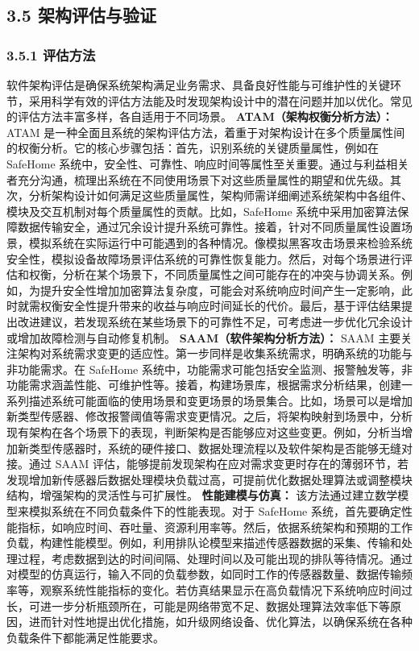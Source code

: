 \subsection{3.5 架构评估与验证}\label{ux67b6ux6784ux8bc4ux4f30ux4e0eux9a8cux8bc1} \subsubsection{3.5.1
评估方法}\label{ux8bc4ux4f30ux65b9ux6cd5}
软件架构评估是确保系统架构满足业务需求、具备良好性能与可维护性的关键环节，采用科学有效的评估方法能及时发现架构设计中的潜在问题并加以优化。常见的评估方法丰富多样，各自适用于不同场景。 \textbf{ATAM（架构权衡分析方法）：}
ATAM 是一种全面且系统的架构评估方法，着重于对架构设计在多个质量属性间的权衡分析。它的核心步骤包括：首先，识别系统的关键质量属性，例如在 SafeHome
系统中，安全性、可靠性、响应时间等属性至关重要。通过与利益相关者充分沟通，梳理出系统在不同使用场景下对这些质量属性的期望和优先级。其次，分析架构设计如何满足这些质量属性，架构师需详细阐述系统架构中各组件、模块及交互机制对每个质量属性的贡献。比如，SafeHome
系统中采用加密算法保障数据传输安全，通过冗余设计提升系统可靠性。接着，针对不同质量属性设置场景，模拟系统在实际运行中可能遇到的各种情况。像模拟黑客攻击场景来检验系统安全性，模拟设备故障场景评估系统的可靠性恢复能力。然后，对每个场景进行评估和权衡，分析在某个场景下，不同质量属性之间可能存在的冲突与协调关系。例如，为提升安全性增加加密算法复杂度，可能会对系统响应时间产生一定影响，此时就需权衡安全性提升带来的收益与响应时间延长的代价。最后，基于评估结果提出改进建议，若发现系统在某些场景下的可靠性不足，可考虑进一步优化冗余设计或增加故障检测与自动修复机制。
\textbf{SAAM（软件架构分析方法）：} SAAM 主要关注架构对系统需求变更的适应性。第一步同样是收集系统需求，明确系统的功能与非功能需求。在 SafeHome
系统中，功能需求可能包括安全监测、报警触发等，非功能需求涵盖性能、可维护性等。接着，构建场景库，根据需求分析结果，创建一系列描述系统可能面临的使用场景和变更场景的场景集合。比如，场景可以是增加新类型传感器、修改报警阈值等需求变更情况。之后，将架构映射到场景中，分析现有架构在各个场景下的表现，判断架构是否能够应对这些变更。例如，分析当增加新类型传感器时，系统的硬件接口、数据处理流程以及软件架构是否能够无缝对接。通过
SAAM 评估，能够提前发现架构在应对需求变更时存在的薄弱环节，若发现增加新传感器后数据处理模块负载过高，可提前优化数据处理算法或调整模块结构，增强架构的灵活性与可扩展性。 \textbf{性能建模与仿真：}
该方法通过建立数学模型来模拟系统在不同负载条件下的性能表现。对于 SafeHome
系统，首先要确定性能指标，如响应时间、吞吐量、资源利用率等。然后，依据系统架构和预期的工作负载，构建性能模型。例如，利用排队论模型来描述传感器数据的采集、传输和处理过程，考虑数据到达的时间间隔、处理时间以及可能出现的排队等待情况。通过对模型的仿真运行，输入不同的负载参数，如同时工作的传感器数量、数据传输频率等，观察系统性能指标的变化。若仿真结果显示在高负载情况下系统响应时间过长，可进一步分析瓶颈所在，可能是网络带宽不足、数据处理算法效率低下等原因，进而针对性地提出优化措施，如升级网络设备、优化算法，以确保系统在各种负载条件下都能满足性能要求。
